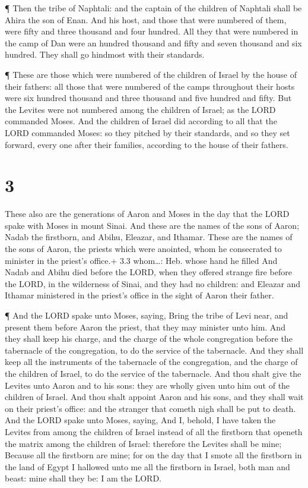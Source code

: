  ¶ Then the tribe of Naphtali: and the captain of the
children of Naphtali shall be Ahira the son of Enan.  And
his host, and those that were numbered of them, were fifty and three
thousand and four hundred.  All they that were numbered in
the camp of Dan were an hundred thousand and fifty and seven thousand
and six hundred. They shall go hindmost with their standards.

 ¶ These are those which were numbered of the children of
Israel by the house of their fathers: all those that were numbered of
the camps throughout their hosts were six hundred thousand and three
thousand and five hundred and fifty.  But the Levites were
not numbered among the children of Israel; as the LORD commanded Moses.
 And the children of Israel did according to all that the
LORD commanded Moses: so they pitched by their standards, and so they
set forward, every one after their families, according to the house of
their fathers.

\hypertarget{section-2}{%
\section{3}\label{section-2}}

 These also are the generations of Aaron and Moses in the
day that the LORD spake with Moses in mount Sinai.  And
these are the names of the sons of Aaron; Nadab the firstborn, and
Abihu, Eleazar, and Ithamar.  These are the names of the
sons of Aaron, the priests which were anointed, whom he consecrated to
minister in the priest's office.+ 3.3 whom\ldots: Heb. whose hand he
filled  And Nadab and Abihu died before the LORD, when they
offered strange fire before the LORD, in the wilderness of Sinai, and
they had no children: and Eleazar and Ithamar ministered in the priest's
office in the sight of Aaron their father.

 ¶ And the LORD spake unto Moses, saying,  Bring
the tribe of Levi near, and present them before Aaron the priest, that
they may minister unto him.  And they shall keep his charge,
and the charge of the whole congregation before the tabernacle of the
congregation, to do the service of the tabernacle.  And they
shall keep all the instruments of the tabernacle of the congregation,
and the charge of the children of Israel, to do the service of the
tabernacle.  And thou shalt give the Levites unto Aaron and
to his sons: they are wholly given unto him out of the children of
Israel.  And thou shalt appoint Aaron and his sons, and
they shall wait on their priest's office: and the stranger that cometh
nigh shall be put to death.  And the LORD spake unto Moses,
saying,  And I, behold, I have taken the Levites from among
the children of Israel instead of all the firstborn that openeth the
matrix among the children of Israel: therefore the Levites shall be
mine;  Because all the firstborn are mine; for on the day
that I smote all the firstborn in the land of Egypt I hallowed unto me
all the firstborn in Israel, both man and beast: mine shall they be: I
am the LORD.


